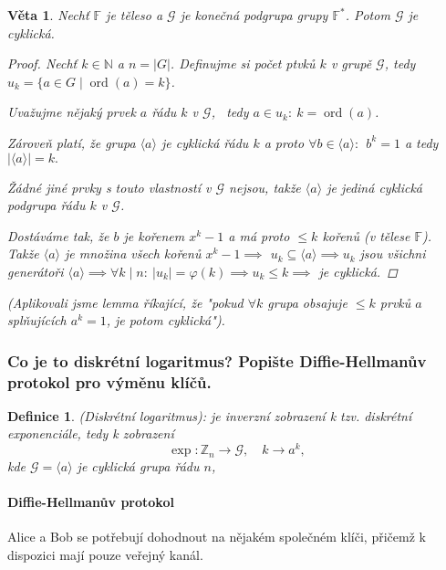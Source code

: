 \documentclass[10pt,a4paper]{article}
\newtheorem{veta}{Věta}
\newtheorem{definice}{Definice}
\newcommand{\N}{{\mathbb{N}}}       %
\newcommand{\Z}{{\mathbb{Z}}}       %
\newcommand{\F}{{\mathbb{F}}}       %
\DeclareMathOperator{\ord}{ord}
\begin{document}
\begin{veta}
    Nechť $\F$ je těleso a $\mathcal{G}$ je konečná podgrupa grupy $\F^*$. Potom $\mathcal{G}$ je cyklická.
    \begin{proof}
        Nechť $k\in \N$ a $n = |G|$. Definujme si počet ptvků $k$ v grupě $\mathcal{G}$, tedy $u_k = \{a \in G \mid \ord(a)=k\}$. 
        
        Uvažujme nějaký prvek $a$ řádu $k$ v $\mathcal{G}$,~ tedy $a\in u_k: ~k = \ord(a)$.

        Zároveň platí, že grupa $\langle a \rangle$ je cyklická řádu $k$ a proto $\forall b \in \langle a \rangle: ~~b^k = 1$ a tedy $|\langle a \rangle|=k.$
            
        Žádné jiné prvky s touto vlastností v $\mathcal{G}$ nejsou, takže $\langle a \rangle$ je jediná cyklická podgrupa řádu $k$ v $\mathcal{G}$.

        Dostáváme tak, že $b$ je kořenem $x^{k}-1$ a má proto $\leq k$ kořenů (v tělese $\F$).
        Takže $\langle a \rangle$ je množina všech kořenů $x^k -1 \implies$
        $u_k \subseteq \langle a \rangle \implies u_k$ jsou všichni generátoři $\langle a \rangle \implies \forall k \mid n:~ |u_k|=\varphi(k) \implies u_k \leq k \implies $ je cyklická.
    \end{proof}
    \textit{(Aplikovali jsme lemma říkající, že "pokud $\forall k$ grupa obsajuje $\leq k$ prvků $a$ splňujících $a^k=1$, je potom cyklická").}
\end{veta}

\subsubsection{Co je to diskrétní logaritmus? Popište Diffie-Hellmanův protokol pro výměnu klíčů.}

\begin{definice} (Diskrétní logaritmus): \normalfont
    je inverzní zobrazení k tzv. diskrétní exponenciále, tedy k zobrazení $$\exp: \Z_n \to \mathcal{G}, \quad k \to a^k,$$ kde $\mathcal{G}=\langle a \rangle$ je cyklická grupa řádu $n$,
\end{definice}

\paragraph*{Diffie-Hellmanův protokol} \normalfont Alice a Bob se potřebují dohodnout na nějakém společném klíči, přičemž k dispozici mají pouze veřejný kanál.
\end{document}
